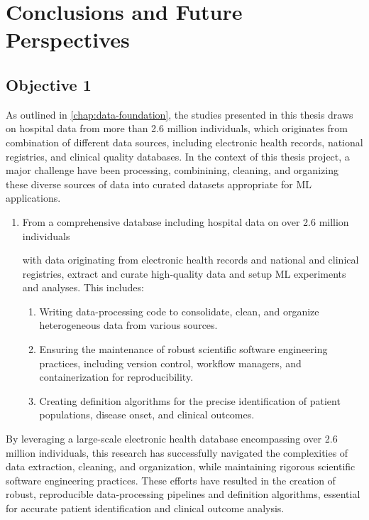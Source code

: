 \chapter{Conclusions and Future Perspectives}
\label{chap:conclusions}
\section{Objective 1}

As outlined in \cref{chap:data-foundation}, 
the studies presented in this thesis draws on hospital data from 
more than \num{2.6} million individuals, which originates from
combination of different data sources, including
electronic health records, national registries, 
and clinical quality databases.
In the context of this thesis project,
a major challenge have been
processing, combinining, cleaning, and 
organizing these diverse sources of data
into curated datasets appropriate for 
\ac{ML} applications.






\begin{enumerate}
    \item 
        From a comprehensive database including 
        hospital data on over \num{2.6} million individuals 

        with data 
        originating from electronic health records and
        national and clinical registries, extract and curate 
        high-quality data and setup \ac{ML} experiments and analyses.
        This includes:
    \begin{enumerate}
        \item Writing data-processing code to 
            consolidate, clean, and organize heterogeneous
            data from various sources.
        \item Ensuring the maintenance of robust scientific software 
            engineering practices, including version control, workflow
            managers, and containerization for reproducibility.
        \item Creating definition algorithms for the precise identification of 
            patient populations, disease onset, and clinical outcomes.
    \end{enumerate}
\end{enumerate}

By leveraging a large-scale electronic health database encompassing over
\num{2.6} million individuals, this research has successfully navigated the
complexities of data extraction, cleaning, and organization, while maintaining
rigorous scientific software engineering practices. These efforts have resulted
in the creation of robust, reproducible data-processing pipelines and
definition algorithms, essential for accurate patient identification and
clinical outcome analysis.

